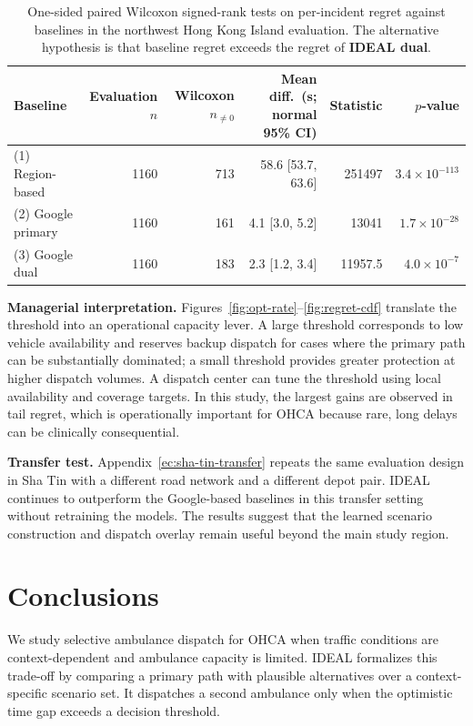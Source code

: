 \documentclass[11pt, letterpaper, oneside, reqno]{amsart}
\begin{document}
\begin{table}[h]
\centering
\small
\caption{One-sided paired Wilcoxon signed-rank tests on per-incident regret against baselines in the northwest Hong Kong Island evaluation. The alternative hypothesis is that baseline regret exceeds the regret of \textbf{IDEAL dual}.}
\label{tab:wilcoxon}
\begin{tabular}{lrrrrr}
\toprule
Baseline & Evaluation $n$ & Wilcoxon $n_{\ne0}$ & Mean diff.\ (s; normal 95\% CI) & Statistic & $p$-value \\
\midrule
(1) Region-based & 1160 & 713 & 58.6 [53.7, 63.6] & 251497 & $3.4\times 10^{-113}$ \\
(2) Google primary & 1160 & 161 & 4.1 [3.0, 5.2] & 13041 & $1.7\times 10^{-28}$ \\
(3) Google dual & 1160 & 183 & 2.3 [1.2, 3.4] & 11957.5 & $4.0\times 10^{-7}$ \\
\bottomrule
\end{tabular}
\end{table}

\noindent\textbf{Managerial interpretation.}
Figures~\ref{fig:opt-rate}--\ref{fig:regret-cdf} translate the threshold into an operational capacity lever. A large threshold corresponds to low vehicle availability and reserves backup dispatch for cases where the primary path can be substantially dominated; a small threshold provides greater protection at higher dispatch volumes. A dispatch center can tune the threshold using local availability and coverage targets. In this study, the largest gains are observed in tail regret, which is operationally important for OHCA because rare, long delays can be clinically consequential.

\noindent\textbf{Transfer test.} Appendix~\ref{ec:sha-tin-transfer} repeats the same evaluation design in Sha Tin with a different road network and a different depot pair. IDEAL continues to outperform the Google-based baselines in this transfer setting without retraining the models. The results suggest that the learned scenario construction and dispatch overlay remain useful beyond the main study region.

\section{Conclusions}\label{sec:conclusions}
We study selective ambulance dispatch for OHCA when traffic conditions are context-dependent and ambulance capacity is limited. IDEAL formalizes this trade-off by comparing a primary path with plausible alternatives over a context-specific scenario set. It dispatches a second ambulance only when the optimistic time gap exceeds a decision threshold.
\end{document}
